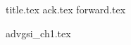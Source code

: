 \documentclass[12pt,letterpaper,oneside]{scrbook}
\begin{document}
\frontmatter
{title.tex}
\clearpage
\thispagestyle{empty}
{ack.tex}
{forward.tex}

\tableofcontents


\mainmatter
{advgsi_ch1.tex}

\backmatter



\end{document}
